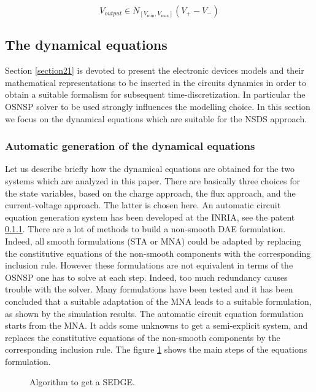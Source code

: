\documentclass{article}
\begin{document}
\begin{equation}
V_{output} \in N_{[V_{\min},V_{\max}]}(V_{+}-V_{-}) 
\end{equation}



\subsection{The dynamical equations}
\label{section23}


Section \ref{section21} is devoted to present the electronic devices models and their mathematical representations to be inserted in the circuits dynamics in order to obtain a suitable formalism for subsequent time-discretization. In particular the OSNSP solver to be used strongly influences the modelling choice. In this section we focus on the dynamical equations which are suitable for the NSDS approach. 


\subsubsection{Automatic generation of the dynamical equations}

Let us describe briefly how the dynamical equations are obtained for the two systems which are analyzed in this paper. There are basically three choices for the state variables, based on the charge approach, the flux approach, and the current-voltage approach. The latter is chosen here. An automatic circuit equation generation system has been developed at the INRIA, see the patent \ref{}.  There are a lot of methods to build a non-smooth DAE formulation. Indeed, all smooth formulations (STA or MNA) could be adapted by replacing the constitutive equations of the non-smooth components
with the corresponding inclusion rule. However these formulations are not equivalent in terms of the OSNSP one has to solve at each step. Indeed, too much redundancy causes trouble with the solver. Many formulations have been tested and it has been concluded that a suitable adaptation of the MNA leads to a suitable formulation, as shown by the simulation results. The automatic circuit equation formulation starts from the MNA. It adds some unknowns to get a semi-explicit system, and replaces the constitutive equations of the non-smooth components by
the corresponding inclusion rule. The figure \ref{fig:acef_algo} shows the main steps of the equations formulation.

\begin{figure}[h]
  \centering
  \scalebox{0.7}{
  
  }
  \caption{Algorithm to get a SEDGE.}
  \label{fig:acef_algo}
\end{figure}
\end{document}
